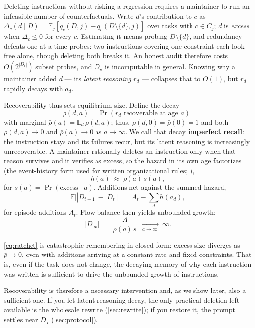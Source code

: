 

Deleting instructions without risking a regression requires a maintainer to run an infeasible number of
counterfactuals. Write $d$'s contribution to $c$ as $\Delta_c(d \mid D) = \mathbb{E}_j[q_c(D, j) - q_c(D
\setminus \{d\}, j)]$ over tasks with $c \in C_j$; $d$ is \emph{excess} when $\Delta_c \le 0$ for every $c$.
Estimating it means probing $D \setminus \{d\}$, and redundancy defeats one-at-a-time probes: two instructions
covering one constraint each look free alone, though deleting both breaks it. An honest audit therefore costs
$O(2^{|D_t|})$ subset probes, and $D_\star$ is incomputable in general. Knowing why a maintainer added $d$ ---
its \emph{latent reasoning} $r_d$ --- collapses that to $O(1)$, but $r_d$ rapidly decays with
$a_d$.




Recoverability thus sets equilibrium size. Define the decay
\begin{equation}
  \rho(d, a) = \Pr(r_d \text{ recoverable at age } a),
\end{equation}
with marginal $\bar \rho(a) = \mathbb{E}_d\,\rho(d, a)$; thus, $\rho(d, 0) = \bar \rho(0) = 1$ and both $\rho(d,
a) \rightarrow 0$ and $\bar \rho(a) \rightarrow 0$ as $a \rightarrow \infty$. We call that decay
\textbf{imperfect recall}: the instruction stays and its failures recur, but its latent reasoning is
increasingly unrecoverable. A maintainer rationally deletes an instruction only when that reason survives and
it verifies as excess, so the hazard in its own age factorizes (the event-history form used for written
organizational rules; \citealp{schulz1998limits, march2000dynamics, zhou1993dynamics}),
\begin{equation}
  h(a) \;\approx\; \bar \rho(a)\, s(a),
  \label{eq:hazard}
\end{equation}
for $s(a) = \Pr(\text{excess} \mid a)$. Additions net against the summed hazard,
\begin{equation}
  \mathbb{E}\bigl[|D_{t+1}| - |D_t|\bigr] \;=\; A_t - \sum_d h(a_d),
  \label{eq:flow}
\end{equation}
for episode additions $A_t$. Flow balance then yields unbounded growth:
\begin{equation}
  |D_\infty| \;=\; \frac{A}{\bar \rho(a)\, s}
  \;\xrightarrow[\;a \to \infty\;]{}\; \infty.
  \label{eq:ratchet}
\end{equation}

\autoref{eq:ratchet} is catastrophic remembering in closed form: excess size diverges as $\bar \rho
\to 0$, even with additions arriving at a constant rate and fixed constraints. That is, even if the task
does not change, the decaying memory of why each instruction was written is sufficient to drive the unbounded
growth of instructions.

Recoverability is therefore a necessary intervention and, as we show later, also a sufficient
one. If you let latent reasoning decay, the only practical deletion left available is the wholesale rewrite
(\autoref{sec:rewrite}); if you restore it, the prompt settles near $D_\star$ (\autoref{sec:protocol}).
